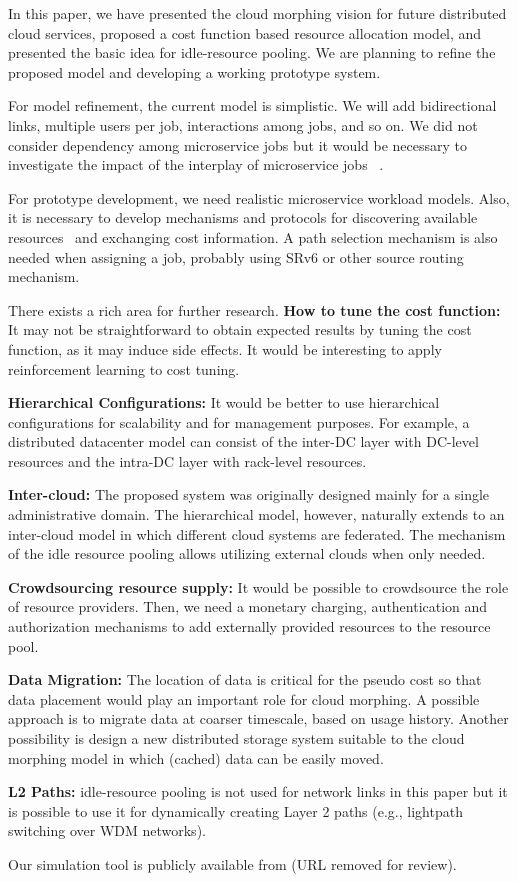 
In this paper, we have presented the cloud morphing vision for
future distributed cloud services,
proposed a cost function based resource allocation model,
and presented the basic idea for idle-resource pooling.
We are planning to refine the proposed model and developing a working
prototype system.

For model refinement,
the current model is simplistic. We will add bidirectional links,
multiple users per job, interactions among jobs, and so on.
We did not consider dependency among microservice jobs but it would be
necessary to investigate the impact of the interplay of microservice
jobs ~\cite{Suresh-SOA-SOCC2017}.

For prototype development,
we need realistic microservice workload models.
Also, it is necessary to develop mechanisms and protocols for
discovering available resources~\cite{Albrecht2008} and exchanging
cost information.
A path selection mechanism is also needed when assigning a job,
probably using SRv6 or other source routing mechanism.

There exists a rich area for further research.
\noindent
{\bf How to tune the cost function:}  It may not be straightforward
to obtain expected results by tuning the cost function, as it may
induce side effects.
It would be interesting to apply reinforcement learning to cost
tuning.

\noindent
{\bf Hierarchical Configurations:} It would be better to use
hierarchical configurations for scalability and for management
purposes.
For example, a distributed datacenter model can consist of
the inter-DC layer with DC-level resources and the intra-DC layer
with rack-level resources.

\noindent
{\bf Inter-cloud:}
The proposed system was originally designed mainly for a single
administrative domain.
The hierarchical model, however, naturally extends to an inter-cloud
model in which different cloud systems are federated.
The mechanism of the idle resource pooling allows utilizing external
clouds when only needed.

\noindent
{\bf Crowdsourcing resource supply:}
It would be possible to crowdsource the role of resource providers. 
Then, we need a monetary charging, authentication and authorization
mechanisms to add externally provided resources to the resource pool.

\noindent
{\bf Data Migration:}
The location of data is critical for the pseudo cost so that data
placement would play an important role for cloud morphing. 
A possible approach is to migrate data at coarser timescale, based
on usage history.
Another possibility is design a new distributed storage system
suitable to the cloud morphing model in which (cached) data can be
easily moved.

\noindent
{\bf L2 Paths:}
idle-resource pooling is not used for network links in this paper but
it is possible to use it for dynamically creating Layer 2 paths (e.g.,
lightpath switching over WDM networks).

Our simulation tool is publicly available from (URL removed for
review).
